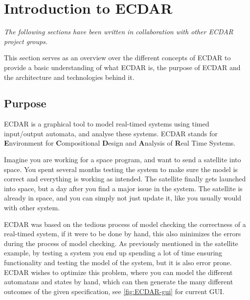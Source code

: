 \section{Introduction to ECDAR}
\textit{The following sections have been written in collaboration with other ECDAR
project groups.}

This section serves as an overview over the different concepts of ECDAR to provide a basic understanding of what ECDAR is, the purpose of ECDAR and the architecture and technologies behind it.


\subsection{Purpose}
ECDAR is a graphical tool to model real-timed systems using timed input/output automata, and analyse these systems. 
ECDAR stands for \textbf{E}nvironment for \textbf{C}ompositional \textbf{D}esign and \textbf{A}nalysis of \textbf{R}eal Time Systems.

Imagine you are working for a space program, and want to send a satellite into space.
You spent several months testing the system to make sure the model is correct and everything is working as intended.
The satellite finally gets launched into space, but a day after you find a major issue in the system.
The satellite is already in space, and you can simply not just update it, like you usually would with other system. \label{ECDAR:satellite}

ECDAR was based on the tedious process of model checking the correctness of a real-timed system, if it were to be done by hand, this also minimizes the errors during the process of model checking.
As previously mentioned in the satellite example, by testing a system you end up spending a lot of time ensuring functionality and testing the model of the system, but it is also error prone.
ECDAR wishes to optimize this problem, where you can model the different automatans and states by hand, which can then generate the many different outcomes of the given specification, see \ref{fig:ECDAR-gui} for current GUI.

